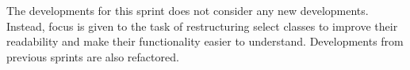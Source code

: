 The developments for this sprint does not consider any new developments.
Instead, focus is given to the task of restructuring select classes to improve their readability and make their functionality easier to understand.
Developments from previous sprints are also refactored.
